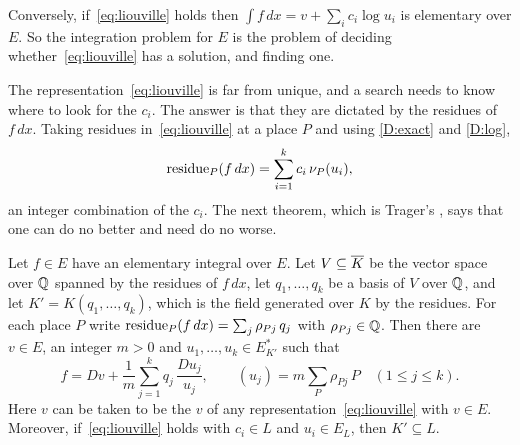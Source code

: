 Conversely, if~\eqref{eq:liouville} holds then $\int f\,dx = v + \sum_i c_i
\log u_i$ is elementary over $E$. So the integration problem for $E$ is the
problem of deciding whether~\eqref{eq:liouville} has a solution, and finding
one.

The representation~\eqref{eq:liouville} is far from unique, and a search
needs to know where to look for the $c_i$. The answer is that they are
dictated by the residues of $f\,dx$. Taking residues in~\eqref{eq:liouville}
at a place $P$ and using \ref{D:exact} and \ref{D:log},
\begin{equation}\label{eq:residue-liouville}
  \operatorname{residue}_P(f\,dx) = \sum_{i=1}^k c_i\, \nu_{P}(u_i) ,
\end{equation}
an integer combination of the $c_i$. The next theorem, which is Trager's
\cite[\S5.1]{trager1984}, says that one can do no better and need do no
worse.

\begin{theorem}\label{thm:liouville-residues}
Let $f \in E$ have an elementary integral over $E$. Let $V \subseteq \overline{K}$
be the vector space over $\mathbb{Q}$ spanned by the residues of $f\,dx$, let $q_1,
\dots, q_k$ be a basis of $V$ over $\mathbb{Q}$, and let $K' = K(q_1, \dots, q_k)$,
which is the field generated over $K$ by the residues. For each place $P$
write $\operatorname{residue}_P(f\,dx) = \sum_j \rho_{Pj}\, q_j$ with $\rho_{Pj} \in \mathbb{Q}$.
Then there are $v \in E$, an integer $m > 0$ and $u_1, \dots, u_k \in
E_{K'}^*$ such that
\begin{equation}\label{eq:liouville-basis}
  f = Dv + \frac{1}{m} \sum_{j=1}^k q_j\, \frac{Du_j}{u_j},
  \qquad (u_j) = m \sum_P \rho_{Pj}\, P \quad (1 \le j \le k).
\end{equation}
Here $v$ can be taken to be the $v$ of any representation~\eqref{eq:liouville}
with $v \in E$. Moreover, if~\eqref{eq:liouville} holds with $c_i \in L$ and
$u_i \in E_L$, then $K' \subseteq L$.
\end{theorem}

